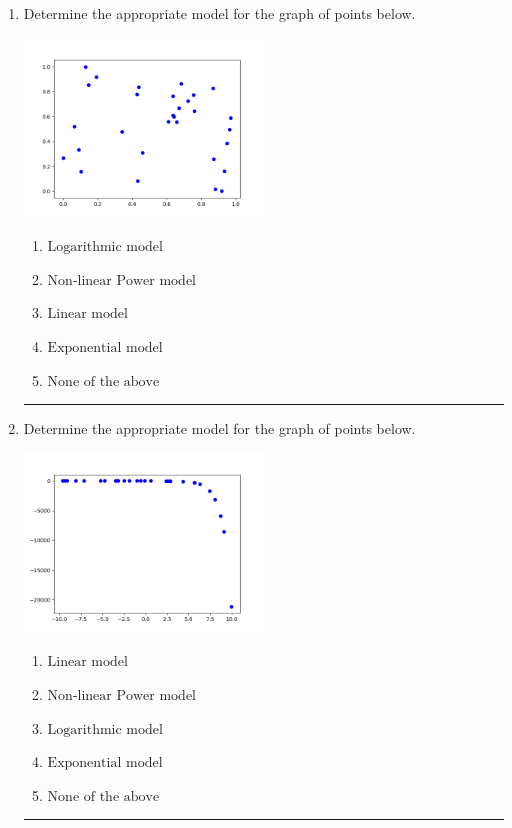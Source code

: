 \documentclass[14pt]{extbook}
\newcommand{\litem}[1]{\item#1\hspace*{-1cm}\rule{\textwidth}{0.4pt}}
\begin{document}
\begin{enumerate}
{\begin{enumerate}[label=\Alph*.]
\end{enumerate} }
\litem{
Determine the appropriate model for the graph of points below.
\begin{center}
    \includegraphics[width=0.5\textwidth]{../Figures/identifyModelGraph12CopyB.png}
\end{center}
\begin{enumerate}[label=\Alph*.]
\item \( \text{Logarithmic model} \)
\item \( \text{Non-linear Power model} \)
\item \( \text{Linear model} \)
\item \( \text{Exponential model} \)
\item \( \text{None of the above} \)

\end{enumerate} }
\litem{
Determine the appropriate model for the graph of points below.
\begin{center}
    \includegraphics[width=0.5\textwidth]{../Figures/identifyModelGraph12B.png}
\end{center}
\begin{enumerate}[label=\Alph*.]
\item \( \text{Linear model} \)
\item \( \text{Non-linear Power model} \)
\item \( \text{Logarithmic model} \)
\item \( \text{Exponential model} \)
\item \( \text{None of the above} \)


\end{enumerate}}
\end{enumerate}
\end{document}
